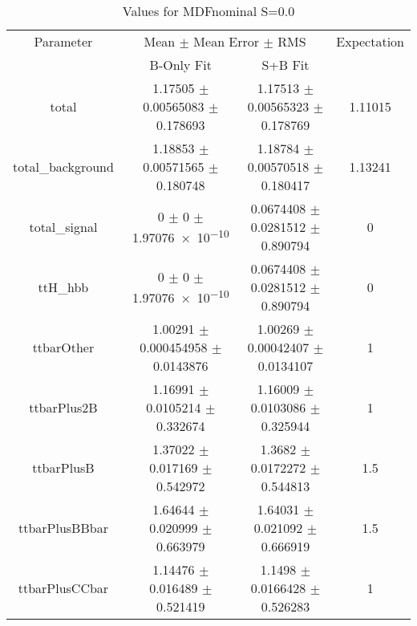 \begin{table}
\centering
\caption{Values for MDFnominal S=0.0}
\begin{tabular}{cccc}
\toprule
Parameter & \multicolumn{2}{c}{Mean $\pm$ Mean Error $\pm$ RMS} & Expectation\\
 & B-Only Fit & S+B Fit & \\
\midrule
total & \num{1.17505} $\pm$ \num{0.00565083} $\pm$ \num{0.178693} & \num{1.17513} $\pm$ \num{0.00565323} $\pm$ \num{0.178769} & \num{1.11015}\\
total\_background & \num{1.18853} $\pm$ \num{0.00571565} $\pm$ \num{0.180748} & \num{1.18784} $\pm$ \num{0.00570518} $\pm$ \num{0.180417} & \num{1.13241}\\
total\_signal & \num{0} $\pm$ \num{0} $\pm$ \num{1.97076e-10} & \num{0.0674408} $\pm$ \num{0.0281512} $\pm$ \num{0.890794} & \num{0}\\
ttH\_hbb & \num{0} $\pm$ \num{0} $\pm$ \num{1.97076e-10} & \num{0.0674408} $\pm$ \num{0.0281512} $\pm$ \num{0.890794} & \num{0}\\
ttbarOther & \num{1.00291} $\pm$ \num{0.000454958} $\pm$ \num{0.0143876} & \num{1.00269} $\pm$ \num{0.00042407} $\pm$ \num{0.0134107} & \num{1}\\
ttbarPlus2B & \num{1.16991} $\pm$ \num{0.0105214} $\pm$ \num{0.332674} & \num{1.16009} $\pm$ \num{0.0103086} $\pm$ \num{0.325944} & \num{1}\\
ttbarPlusB & \num{1.37022} $\pm$ \num{0.017169} $\pm$ \num{0.542972} & \num{1.3682} $\pm$ \num{0.0172272} $\pm$ \num{0.544813} & \num{1.5}\\
ttbarPlusBBbar & \num{1.64644} $\pm$ \num{0.020999} $\pm$ \num{0.663979} & \num{1.64031} $\pm$ \num{0.021092} $\pm$ \num{0.666919} & \num{1.5}\\
ttbarPlusCCbar & \num{1.14476} $\pm$ \num{0.016489} $\pm$ \num{0.521419} & \num{1.1498} $\pm$ \num{0.0166428} $\pm$ \num{0.526283} & \num{1}\\
\bottomrule
\end{tabular}
\end{table}